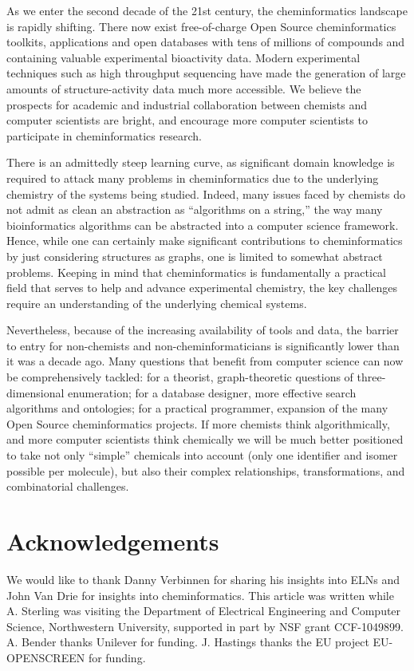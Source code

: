 \documentclass{sig-alternate}
\begin{document}
As we enter the second decade of the 21st century, the cheminformatics
landscape is rapidly shifting.  There now exist free-of-charge Open
Source cheminformatics toolkits, applications and open databases with
tens of millions of compounds and containing valuable experimental
bioactivity data. Modern experimental techniques such as high
throughput sequencing have made the generation of large amounts of
structure-activity data much more accessible.  We believe the
prospects for academic and industrial collaboration between chemists
and computer scientists are bright, and encourage more computer
scientists to participate in cheminformatics research.

There is an admittedly steep learning curve, as significant domain
knowledge is required to attack many problems in cheminformatics due
to the underlying chemistry of the systems being studied. Indeed, many
issues faced by chemists do not admit as clean an abstraction as
``algorithms on a string,'' the way many bioinformatics algorithms can
be abstracted into a computer science framework.  Hence, while
one can certainly make significant contributions to cheminformatics by
just considering structures as graphs, one is limited to somewhat
abstract problems. Keeping in mind that cheminformatics is
fundamentally a practical field that serves to help and advance
experimental chemistry, the key challenges require an understanding of
the underlying chemical systems.

Nevertheless, because of the increasing availability of tools and
data, the barrier to entry for non-chemists and non-cheminformaticians
is significantly lower than it was a decade ago. Many questions that
benefit from computer science can now be comprehensively tackled: for
a theorist, graph-theoretic questions of three-dimensional
enumeration; for a database designer, more effective search algorithms
and ontologies; for a practical programmer, expansion of the many
Open Source cheminformatics projects.  If more chemists think
algorithmically, and more computer scientists think chemically we will be
much better positioned to take not only ``simple'' chemicals into
account (only one identifier and isomer possible per molecule), but
also their complex relationships, transformations, and combinatorial
challenges.

\section{Acknowledgements}
We would like to thank Danny Verbinnen for sharing his insights into
ELNs and John Van Drie for insights into cheminformatics.  This
article was written while A. Sterling was visiting the Department of
Electrical Engineering and Computer Science, Northwestern University,
supported in part by NSF grant CCF-1049899. A. Bender thanks Unilever
for funding. J. Hastings thanks the EU project EU-OPENSCREEN for
funding.
\end{document}
